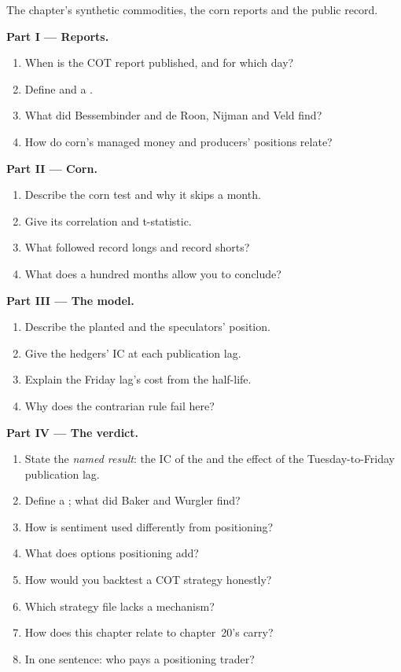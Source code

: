 \begin{problem}\label{pb:s1:positioning-and-sentiment:1}
The chapter's synthetic commodities, the corn reports and the public record.

\medskip\noindent\textbf{Part I --- Reports.}
\begin{enumerate}
\item When is the COT report published, and for which day?
\item Define  and a .
\item What did Bessembinder and de Roon, Nijman and Veld find?
\item How do corn's managed money and producers' positions relate?
\end{enumerate}

\medskip\noindent\textbf{Part II --- Corn.}
\begin{enumerate}[resume]
\item Describe the corn test and why it skips a month.
\item Give its correlation and t-statistic.
\item What followed record longs and record shorts?
\item What does a hundred months allow you to conclude?
\end{enumerate}

\medskip\noindent\textbf{Part III --- The model.}
\begin{enumerate}[resume]
\item Describe the planted  and the speculators' position.
\item Give the hedgers' IC at each publication lag.
\item Explain the Friday lag's cost from the half-life.
\item Why does the contrarian rule fail here?
\end{enumerate}

\medskip\noindent\textbf{Part IV --- The verdict.}
\begin{enumerate}[resume]
\item State the \emph{named result}: the IC of the  and the effect of the Tuesday-to-Friday publication lag.
\item Define a ; what did Baker and Wurgler find?
\item How is sentiment used differently from positioning?
\item What does options positioning add?
\item How would you backtest a COT strategy honestly?
\item Which strategy file lacks a mechanism?
\item How does this chapter relate to chapter~20's carry?
\item In one sentence: who pays a positioning trader?
\end{enumerate}
\end{problem}

